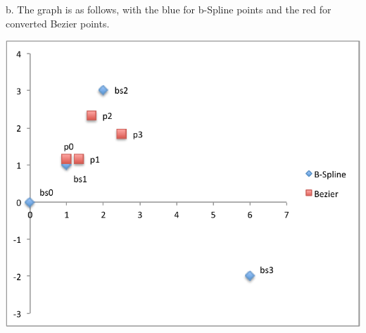 \documentclass{letter}
\begin{document}
b. The graph is as follows, with the blue for b-Spline points and the red for converted Bezier points. 

 \includegraphics{bezier-plot4}
 
\end{document}
